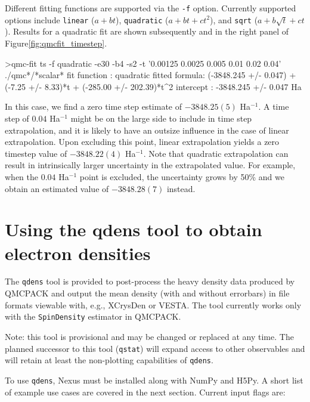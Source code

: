 Different fitting functions are supported via the \texttt{-f} option.
Currently supported options include \texttt{linear} ($a+bt$),
\texttt{quadratic} ($a+bt+ct^2$), and \texttt{sqrt} ($a+b\sqrt{t}+ct$).
Results for a quadratic fit are shown subsequently and in the right
panel of Figure\ref{fig:qmcfit_timestep}.
\begin{shade}
>qmc-fit ts -f quadratic -e30 -b4 -s2 -t '0.00125 0.0025 0.005 0.01 0.02 0.04' ./qmc*/*scalar*
fit function  : quadratic
fitted formula: (-3848.245 +/- 0.047) + (-7.25 +/- 8.33)*t + (-285.00 +/- 202.39)*t^2
intercept     : -3848.245 +/- 0.047  Ha
\end{shade}
In this case, we find a zero time step estimate of $-3848.25(5)$ Ha$^{-1}$.
A time step of $0.04$ Ha$^{-1}$ might be on the large side to include in
time step extrapolation, and it is likely to have an outsize influence
in the case of linear extrapolation.  Upon excluding this point, linear
extrapolation yields a zero timestep value of $-3848.22(4)$ Ha$^{-1}$.
Note that quadratic extrapolation can result in intrinsically
larger uncertainty in the extrapolated value.  For example, when the $0.04$
Ha$^{-1}$ point is excluded, the uncertainty grows by 50\% and we obtain an
estimated value of $-3848.28(7)$ instead.


\section{Using the qdens tool to obtain electron densities}
\label{sec:qdens}

The \texttt{qdens} tool is provided to post-process the heavy density data 
produced by QMCPACK and output the mean density (with and without errorbars) 
in file formats viewable with, e.g.,  XCrysDen or VESTA.  The tool currently 
works only with the \texttt{SpinDensity} estimator in QMCPACK.

Note: this tool is provisional and may be changed or replaced at any time.  
The planned successor to this tool (\texttt{qstat}) will expand access to 
other observables and will retain at least the non-plotting capabilities of 
\texttt{qdens}.

To use \texttt{qdens}, Nexus must be installed along with NumPy and H5Py. 
A short list of example use cases are covered in the next section.  Current 
input flags are:

